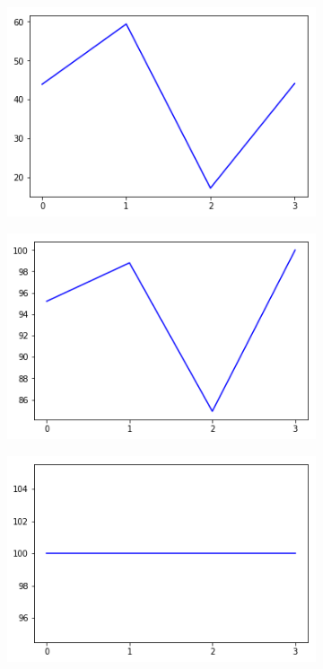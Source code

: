 \begin{figure}[h!]
  \begin{subfigure}[b]{0.3\linewidth}
    \includegraphics[width=\linewidth]{images/subst1/ef0_percent.png}
    \caption{}
  \end{subfigure}
  \begin{subfigure}[b]{0.3\linewidth}
    \includegraphics[width=\linewidth]{images/subst1/ef1_percent.png}
    \caption{}
  \end{subfigure}
  \begin{subfigure}[b]{0.3\linewidth}
    \includegraphics[width=\linewidth]{images/subst1/ef2_percent.png}
    \caption{}
  \end{subfigure}
    

\end{figure}
